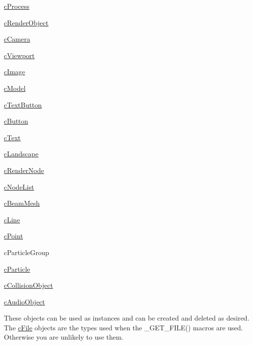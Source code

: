 \begin{DoxyItemize}
\item \hyperlink{classc_process}{cProcess}
\item \hyperlink{classc_render_object}{cRenderObject}
\item \hyperlink{classc_camera}{cCamera}
\item \hyperlink{classc_viewport}{cViewport}
\begin{DoxyItemize}
\item \hyperlink{classc_image}{cImage}
\item \hyperlink{classc_model}{cModel}
\item \hyperlink{classc_text_button}{cTextButton}
\item \hyperlink{classc_button}{cButton}
\item \hyperlink{classc_text}{cText}
\item \hyperlink{classc_landscape}{cLandscape}
\item \hyperlink{classc_render_node}{cRenderNode}
\item \hyperlink{classc_node_list}{cNodeList}
\item \hyperlink{classc_beam_mesh}{cBeamMesh}
\item \hyperlink{classc_line}{cLine}
\item \hyperlink{classc_point}{cPoint}
\item cParticleGroup
\item \hyperlink{classc_particle}{cParticle}
\end{DoxyItemize}
\item \hyperlink{classc_collision_object}{cCollisionObject}
\item \hyperlink{classc_audio_object}{cAudioObject}
\end{DoxyItemize}These objects can be used as instances and can be created and deleted as desired. The \hyperlink{classc_file}{cFile} objects are the types used when the \_\-GET\_\-FILE() macros are used. Otherwise you are unlikely to use them.
